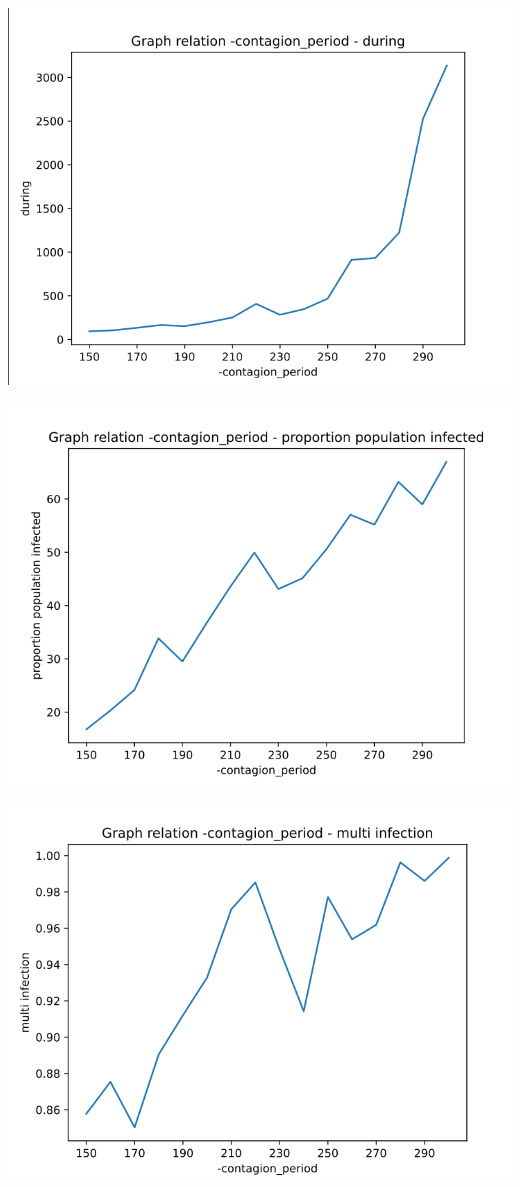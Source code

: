 \documentclass[a4paper, 11pt]{article}
\begin{document}
				\includegraphics[scale=0.45]{attachements/contagion_period_during.png}
				
				\includegraphics[scale=0.45]{attachements/contagion_period_proportion.png}
				
				\includegraphics[scale=0.45]{attachements/contagion_period_multi_infection.png}
				
\end{document}
